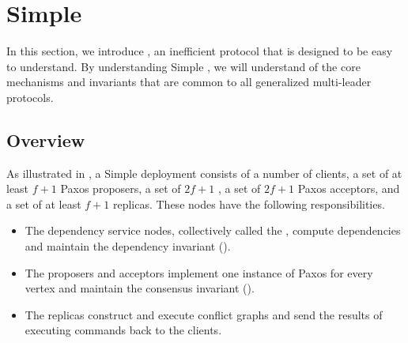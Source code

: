 \section{Simple \BPaxos{}}
In this section, we introduce , an inefficient
protocol that is designed to be easy to understand. By understanding Simple
\BPaxos{}, we will understand of the core mechanisms and invariants that are
common to all generalized multi-leader protocols.

\subsection{Overview}
{}

As illustrated in , a Simple \BPaxos{} deployment consists
of a number of clients, a set of at least $f+1$ Paxos proposers, a set of
$2f+1$ , a set of $2f+1$ Paxos acceptors, and
a set of at least $f+1$ replicas. These nodes have the following responsibilities.
\begin{itemize}
  \item
    The dependency service nodes, collectively called the , compute dependencies and maintain the dependency invariant
    ().

  \item
    The proposers and acceptors implement one instance of Paxos for every
    vertex and maintain the consensus invariant ().

  \item
    The replicas construct and execute conflict graphs and send the results of
    executing commands back to the clients.
\end{itemize}

